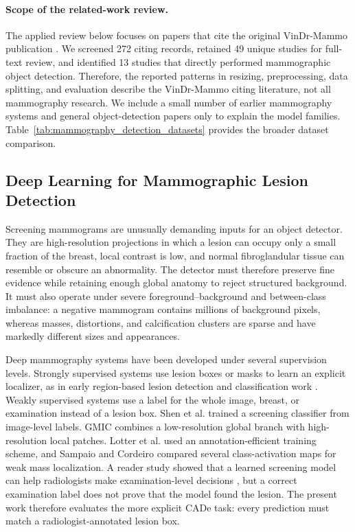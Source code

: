 \paragraph{Scope of the related-work review.}
The applied review below focuses on papers that cite the original VinDr-Mammo
publication \cite{nguyen2023vindr}. We screened 272 citing records, retained 49
unique studies for full-text review, and identified 13 studies that directly
performed mammographic object detection. Therefore, the reported patterns in
resizing, preprocessing, data splitting, and evaluation describe the
VinDr-Mammo citing literature, not all mammography research. We include a small
number of earlier mammography systems and general object-detection papers only
to explain the model families. Table~\ref{tab:mammography_detection_datasets}
provides the broader dataset comparison.

\subsection{Deep Learning for Mammographic Lesion Detection}
\label{sec:background_mammo_detection}

Screening mammograms are unusually demanding inputs for an object detector.
They are high-resolution projections in which a lesion can occupy only a small
fraction of the breast, local contrast is low, and normal fibroglandular tissue
can resemble or obscure an abnormality.  The detector must therefore preserve
fine evidence while retaining enough global anatomy to reject structured
background.  It must also operate under severe foreground--background and
between-class imbalance: a negative mammogram contains millions of background
pixels, whereas masses, distortions, and calcification clusters are sparse and
have markedly different sizes and appearances.

Deep mammography systems have been developed under several supervision levels.
Strongly supervised systems use lesion boxes or masks to learn an explicit
localizer, as in early region-based lesion detection and classification work
\cite{ribli2018lesions}. Weakly supervised systems use a label for the whole
image, breast, or examination instead of a lesion box. Shen et al.
\cite{shen2019screening} trained a screening classifier from image-level
labels. GMIC \cite{shen2021gmic} combines a low-resolution global branch with
high-resolution local patches. Lotter et al. \cite{lotter2021robust} used an
annotation-efficient training scheme, and Sampaio and Cordeiro
\cite{sampaio2023weak} compared several class-activation maps for weak mass
localization. A reader study showed that a learned screening model can help
radiologists make examination-level decisions \cite{wu2020radiologists}, but a
correct examination label does not prove that the model found the lesion. The
present work therefore evaluates the more explicit CADe task: every prediction
must match a radiologist-annotated lesion box.

